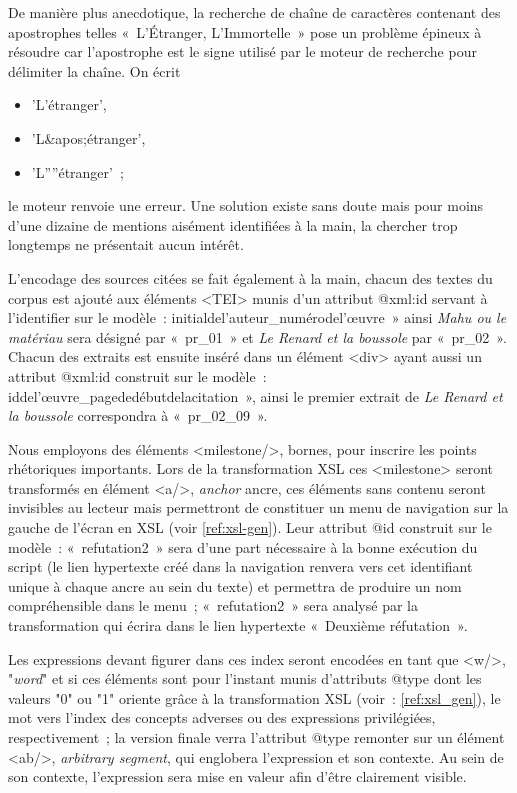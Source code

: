 \documentclass[12pt, a4paper]{article}
\begin{document}
De manière plus anecdotique, la recherche de chaîne de caractères contenant des apostrophes telles «~L'Étranger, L'Immortelle~» pose un problème épineux à résoudre car l'apostrophe est le signe utilisé par le moteur de recherche pour délimiter la chaîne. On écrit 
\begin{itemize}
    \item 'L'étranger', 
    \item 'L\&apos;étranger',
    \item 'L''''étranger'~; 
\end{itemize}
le moteur renvoie une erreur. Une solution existe sans doute mais pour moins d'une dizaine de mentions aisément identifiées à la main, la chercher trop longtemps ne présentait aucun intérêt.


L'encodage des sources citées se fait également à la main, chacun des textes du corpus est ajouté aux éléments <TEI> munis d'un attribut @xml\NoAutoSpaceBeforeFDP:id servant à l'identifier sur le modèle~: initialdel'auteur\_numérodel'œuvre~» ainsi \textit{Mahu ou le matériau} sera désigné par «~pr\_01~» et \textit{Le Renard et la boussole} par «~pr\_02~». Chacun des extraits est ensuite inséré dans un élément <div> ayant aussi un attribut @xml\NoAutoSpaceBeforeFDP:id construit sur le modèle~: iddel'œuvre\_pagededébutdelacitation~», ainsi le premier extrait de \textit{Le Renard et la boussole} correspondra à «~pr\_02\_09~».    

\label{encMilestone} Nous employons des éléments <milestone/>, bornes, pour inscrire les points rhétoriques importants. Lors de la transformation XSL ces <milestone> seront transformés en élément <a/>, \textit{anchor} ancre, ces éléments sans contenu seront invisibles au lecteur mais permettront de constituer un menu de navigation sur la gauche de l'écran en XSL (voir \ref{ref:xsl-gen}). Leur attribut @id construit sur le modèle~: «~refutation2~»
sera d'une part nécessaire à la bonne exécution du script (le lien hypertexte créé dans la navigation renvera vers cet identifiant unique à chaque ancre au sein du texte) et permettra de produire un nom compréhensible dans le menu~; «~refutation2~» sera analysé par la transformation qui écrira dans le lien hypertexte «~Deuxième réfutation~».


\label{encW} Les expressions devant figurer dans ces index seront encodées en tant que <w/>, "\textit{word}" et  si ces éléments sont pour l'instant munis d'attributs @type dont les valeurs "0" ou "1" oriente grâce à la transformation XSL (voir~: \ref{ref:xsl_gen}), le mot vers l'index des concepts adverses ou des expressions privilégiées, respectivement~; la version finale verra l'attribut @type remonter sur un élément <ab/>, \textit{arbitrary segment}, qui englobera l'expression et son contexte. Au sein de son contexte, l'expression sera mise en valeur afin d'être clairement visible.
\end{document}
